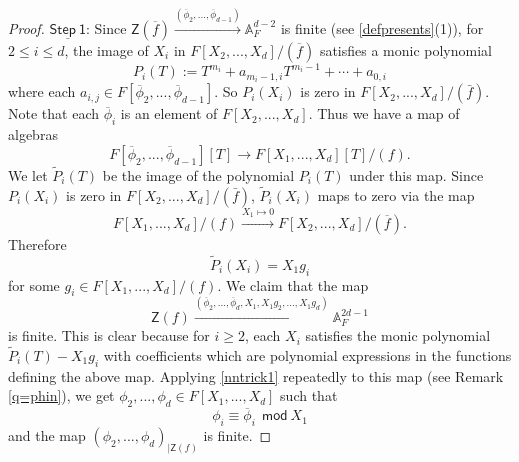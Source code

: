 \documentclass[10pt]{amsart}
\theoremstyle{plain}
\theoremstyle{definition}
\renewcommand{\tilde}{\widetilde}
\newcommand{\A}{{\mathbb A}}
\let\syn\mathsf
\newcommand{\Step}[1]{\underline{\syn{Step \ {#1}}}}
\begin{document}
\begin{proof}
\noindent $\Step{1}$: Since $\syn{Z}(\overline{f}) \xrightarrow{(\overline{\phi}_2,...,\overline{\phi}_{d-1})} \A^{d-2}_F$ is finite (see \ref{defpresents}(1)), for $2\leq i \leq d$, the image of $X_i$ in $F[X_2,...,X_d]/(\overline{f})$ satisfies a monic polynomial 
$$ P_i(T) := T^{m_i}+a_{m_i-1,i}T^{m_i-1} + \cdots + a_{0,i} $$
where each $a_{i,j} \in F[\overline{\phi}_2,...,\overline{\phi}_{d-1}]$. So $P_i(X_i)$ is zero in $F[X_2,...,X_d]/(\bar{f})$. Note that each $\overline{\phi}_i$ is an element of $F[X_2,...,X_d]$. Thus we have a map of algebras
$$F[\overline{\phi}_2,...,\overline{\phi}_{d-1}][T] \rightarrow  F[X_1,...,X_d][T]/(f).$$
We let $\tilde{P}_i(T)$ be the image of the  polynomial $P_i(T)$ under this map. 
Since $P_i(X_i)$ is zero in $F[X_2,...,X_d]/(\bar{f})$, $\tilde{P}_i(X_i)$ maps to zero via the map 
$$ F[X_1,...,X_d]/(f) \xrightarrow{X_1\mapsto 0} F[X_2,...,X_d]/(\overline{f}).$$
Therefore 
$$ \tilde{P}_i(X_i) = X_1g_i$$ for some $g_i\in F[X_1,...,X_d]/(f)$. We claim that the map 
$$ \syn{Z}(f) \xrightarrow{(\overline{\phi}_2,...,\overline{\phi}_{d},X_1,X_1g_2,...,X_1g_d)} \A^{2d-1}_F $$
is finite. This is clear because for $i\geq 2$, each $X_i$ satisfies the monic polynomial $\tilde{P}_i(T)-X_1g_i$  with coefficients which are polynomial expressions in the functions defining the above map. 
Applying \ref{nntrick1} repeatedly to this map (see Remark \ref{q=phin}), we get $\phi_2,...,\phi_d\in F[X_1,...,X_d]$ such that 
$$ \phi_i \equiv \overline{\phi}_i \ \ \syn{mod} \ X_1$$ 
and the map $(\phi_2,...,\phi_{d})_{|\syn{Z}({f})}$ is finite. 



\end{proof}
\end{document}

